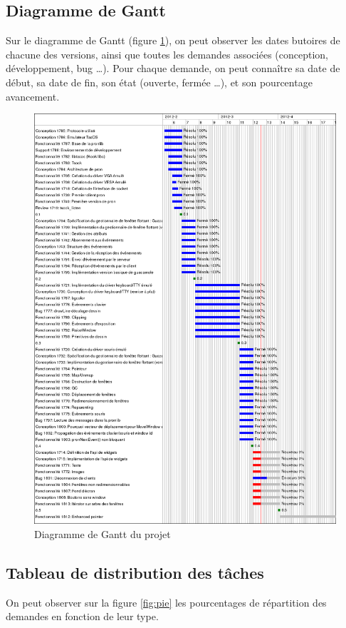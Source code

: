 \subsection{Diagramme de Gantt}
Sur le diagramme de Gantt (figure \ref{fig:diagGant}), on peut observer les dates butoires de chacune des versions, ainsi que toutes les demandes associées (conception, développement, bug \ldots). Pour chaque demande, on peut connaître sa date de début, sa date de fin, son état (ouverte, fermée \ldots), et son pourcentage avancement.
\begin{figure}[H!]
  \centering
    \includegraphics[width=15cm]{figures/tacos-gui-gantt}
  \caption{\label{fig:diagGant}Diagramme de Gantt du projet}
\end{figure}

\subsection{Tableau de distribution des tâches}
On peut observer sur la figure \ref{fig:pie} les pourcentages de répartition des demandes en fonction de leur type.
